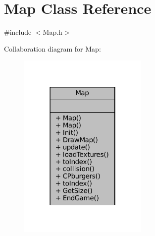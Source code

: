 \hypertarget{classMap}{}\section{Map Class Reference}
\label{classMap}


{\ttfamily \#include $<$Map.\+h$>$}



Collaboration diagram for Map\+:\nopagebreak
\begin{figure}[H]
\begin{center}
\leavevmode
\includegraphics[width=178pt]{classMap__coll__graph}
\end{center}
\end{figure}

